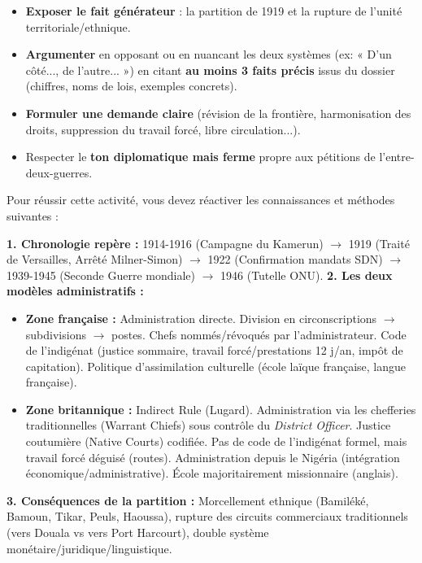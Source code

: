 \documentclass[11pt]{article}
\newcommand{\cle}[1]{{\popxbold\color{popdark}#1}}
\newcounter{popsec}
\newcounter{popsub}
\newcommand{\courssub}[1]{%
  \stepcounter{popsub}%
  \par\vspace{9pt}\noindent{\popxbold\fontsize{11.5}{13}\selectfont\color{popink}{\color{poporange}\thepopsec.\thepopsub}\hspace{6pt}#1}\par\nopagebreak\vspace{4pt}
}
\begin{document}
\begin{enumerate}
\begin{itemize}
        \item \textbf{Exposer le fait générateur} : la partition de 1919 et la rupture de l'unité territoriale/ethnique.
        \item \textbf{Argumenter} en opposant ou en nuancant les deux systèmes (ex: « D'un côté..., de l'autre... ») en citant \textbf{au moins 3 faits précis} issus du dossier (chiffres, noms de lois, exemples concrets).
        \item \textbf{Formuler une demande claire} (révision de la frontière, harmonisation des droits, suppression du travail forcé, libre circulation...).
        \item Respecter le \textbf{ton diplomatique mais ferme} propre aux pétitions de l'entre-deux-guerres.
    \end{itemize}
\end{enumerate}

\courssub{Ressources à mobiliser}
\noindent Pour réussir cette activité, vous devez réactiver les connaissances et méthodes suivantes :

\begin{aretenir}
\textbf{1. Chronologie repère :} 1914-1916 (Campagne du Kamerun) $\rightarrow$ 1919 (Traité de Versailles, Arrêté Milner-Simon) $\rightarrow$ 1922 (Confirmation mandats SDN) $\rightarrow$ 1939-1945 (Seconde Guerre mondiale) $\rightarrow$ 1946 (Tutelle ONU).
\textbf{2. Les deux modèles administratifs :}
\begin{itemize}
    \item \textbf{Zone française :} \cle{Administration directe}. Division en circonscriptions $\rightarrow$ subdivisions $\rightarrow$ postes. Chefs nommés/révoqués par l'administrateur. \cle{Code de l'indigénat} (justice sommaire, travail forcé/prestations 12 j/an, impôt de capitation). Politique d'\cle{assimilation} culturelle (école laïque française, langue française).
    \item \textbf{Zone britannique :} \cle{Indirect Rule} (Lugard). Administration via les \cle{chefferies traditionnelles} (Warrant Chiefs) sous contrôle du \emph{District Officer}. Justice coutumière (\cle{Native Courts}) codifiée. Pas de code de l'indigénat formel, mais travail forcé déguisé (routes). Administration depuis le \cle{Nigéria} (intégration économique/administrative). École majoritairement missionnaire (anglais).
\end{itemize}
\textbf{3. Conséquences de la partition :} Morcellement ethnique (Bamiléké, Bamoun, Tikar, Peuls, Haoussa), rupture des circuits commerciaux traditionnels (vers Douala vs vers Port Harcourt), double système monétaire/juridique/linguistique.
\end{aretenir}
\end{document}
